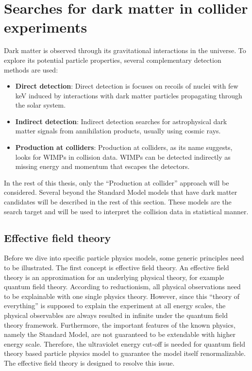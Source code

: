 \section{Searches for dark matter in collider experiments}
\label{sec:dms3}
\par Dark matter is observed through its gravitational interactions in the universe. To explore its potential particle properties, several complementary detection methods are used\cite{Undagoitia:2015gya}: 
\begin{itemize}
  \item \textbf{Direct detection}: Direct detection is focuses on recoils of nuclei with few keV induced by interactions with dark matter particles propagating through the solar system.
  \item \textbf{Indirect detection}: Indirect detection searches for astrophysical dark matter signals from annihilation products, usually using cosmic rays.
  \item \textbf{Production at colliders}: Production at colliders, as its name suggests, looks for WIMPs in collision data. WIMPs can be detected indirectly as missing energy and momentum that escapes the detectors.
\end{itemize}

\par In the rest of this thesis, only the ``Production at collider'' approach will be considered. Several beyond the Standard Model models that have dark matter candidates will be described in the rest of this section. These models are the search target and will be used to interpret the collision data in statistical manner.

\subsection{Effective field theory}
Before we dive into specific particle physics models, some generic principles need to be illustrated. The first concept is effective field theory. An effective field theory is an approximation for an underlying physical theory, for example quantum field theory. According to reductionism, all physical observations need to be explainable with one single physics theory. However, since this “theory of everything” is supposed to explain the experiment at all energy scales, the physical observables are always resulted in infinite under the quantum field theory framework. Furthermore, the important features of the known physics, namely the Standard Model, are not guaranteed to be extendable with higher energy scale. Therefore, the ultraviolet energy cut-off is needed for quantum field theory based particle physics model to guarantee the model itself renormalizable. The effective field theory\cite{Pich:1998xt} is designed to resolve this issue.

